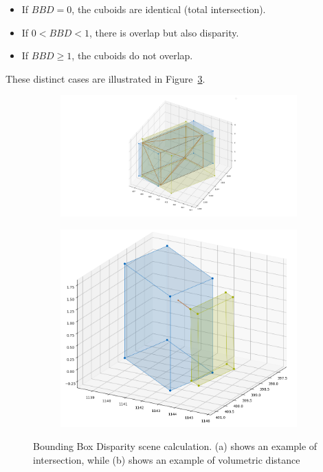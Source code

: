 \begin{itemize}
    \item If $BBD = 0$, the cuboids are identical (total intersection).
    \item If $0 < BBD < 1$, there is overlap but also disparity.
    \item If $BBD \geq 1$, the cuboids do not overlap.
\end{itemize}

These distinct cases are illustrated in Figure~\ref{fig:bbox_disparity}.

\begin{figure}[h!]
    \centering
    \begin{subfigure}[b]{0.45\textwidth}
        \includegraphics[width=\textwidth]{images/methodology/frame_0_3d_bb.png}
        \caption{}
        \label{fig:bbox_disparity_a}
    \end{subfigure}
    \begin{subfigure}[b]{0.45\textwidth}
        \includegraphics[width=\textwidth]{images/methodology/frame_2_3d_bb.png}
        \caption{}
        \label{fig:bbox_disparity_b}
    \end{subfigure}
    \caption{Bounding Box Disparity scene calculation. (a) shows an example of intersection, while (b) shows an example of volumetric distance}
    \label{fig:bbox_disparity}
\end{figure}


